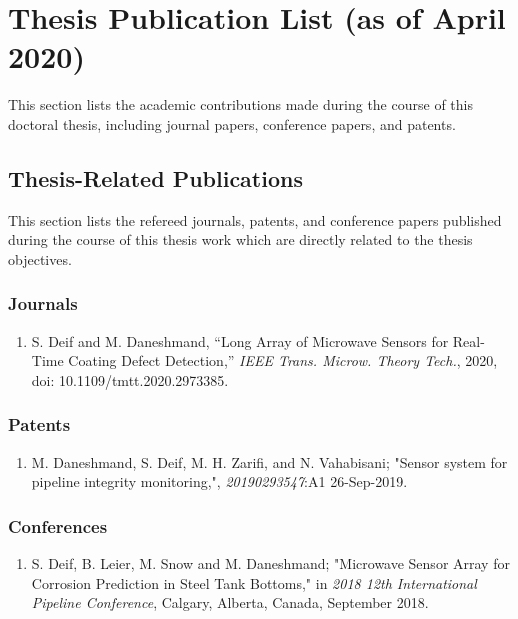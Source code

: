 \chapter*{Thesis Publication List (as of April 2020)}

This section lists the academic contributions made during the course of this doctoral thesis, including journal papers, conference papers, and patents.

\section*{Thesis-Related Publications}
This section lists the refereed journals, patents, and conference papers published during the course of this thesis work which are directly related to the thesis objectives.

\subsection*{Journals}
\begin{enumerate}
    \item S. Deif and M. Daneshmand, “Long Array of Microwave Sensors for Real-Time Coating Defect Detection,” \textit{IEEE Trans. Microw. Theory Tech.}, 2020, doi: 10.1109/tmtt.2020.2973385.
    
\end{enumerate}

\subsection*{Patents}
\begin{enumerate}
	\item M. Daneshmand, S. Deif, M. H. Zarifi, and N. Vahabisani; "Sensor system for pipeline integrity monitoring,", \textit{20190293547}:A1 26-Sep-2019. 
\end{enumerate}

\subsection*{Conferences}
\begin{enumerate}
   \item S. Deif, B. Leier, M. Snow and M. Daneshmand; "Microwave Sensor Array for Corrosion Prediction in Steel Tank Bottoms,"  in \textit{2018 12th International Pipeline Conference}, Calgary, Alberta, Canada, September 2018.
 
\end{enumerate}

